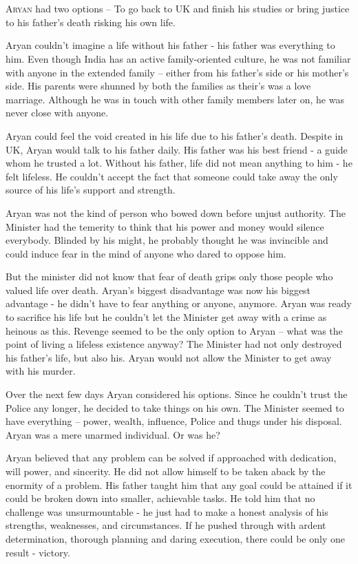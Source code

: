 \chapter{}

\lettrine{A}{ryan} had two options – To go back to UK and finish his studies or bring justice
to his father's death risking his own life.

Aryan couldn't imagine a life without his father - his father was everything to
him. Even though India has an active family-oriented culture, he was not
familiar with anyone in the extended family – either from his father's side or
his mother's side. His parents were shunned by both the families as their's was
a love marriage. Although he was in touch with other family members later on, he
was never close with anyone.

Aryan could feel the void created in his life due to his father's death. Despite
in UK, Aryan would talk to his father daily. His father was his best friend - a
guide whom he trusted a lot. Without his father, life did not mean anything to
him - he felt lifeless. He couldn't accept the fact that someone could take away
the only source of his life's support and strength.

Aryan was not the kind of person who bowed down before unjust authority. The
Minister had the temerity to think that his power and money would silence
everybody. Blinded by his might, he probably thought he was invincible and could
induce fear in the mind of anyone who dared to oppose him.

But the minister did not know that fear of death grips only those people who
valued life over death. Aryan's biggest disadvantage was now his biggest
advantage - he didn't have to fear anything or anyone, anymore. Aryan was ready
to sacrifice his life but he couldn't let the Minister get away with a crime as
heinous as this. Revenge seemed to be the only option to Aryan – what was the
point of living a lifeless existence anyway? The Minister had not only destroyed
his father's life, but also his. Aryan would not allow the Minister to get away
with his murder.

Over the next few days Aryan considered his options. Since he couldn't trust the
Police any longer, he decided to take things on his own. The Minister seemed to
have everything – power, wealth, influence, Police and thugs under his disposal.
Aryan was a mere unarmed individual. Or was he?

Aryan believed that any problem can be solved if approached with dedication,
will power, and sincerity. He did not allow himself to be taken aback by the
enormity of a problem. His father taught him that any goal could be attained if
it could be broken down into smaller, achievable tasks. He told him that no
challenge was unsurmountable - he just had to make a honest analysis of his
strengths, weaknesses, and circumstances. If he pushed through with ardent
determination, thorough planning and daring execution, there could be only one
result - victory.

